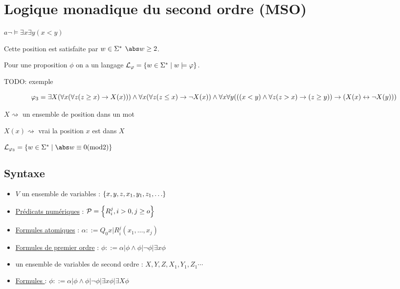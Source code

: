 \section{Logique monadique du second ordre (MSO)}

$ a \neg {\models} \exists x \exists y (x < y)$

Cette position est satisfaite par $w \in \Sigma^{*}$ \ssi $\abs w \geq 2$.

Pour une proposition $\phi$ on a un langage $\mathcal{L}_\varphi = \left\{w \in \Sigma^{*} \mid w \models \varphi\right\}$.


TODO: exemple


$$\varphi_3 = \exists X (\forall x (\forall z (z \geq x) \rightarrow X(x))) \land \forall x (\forall z (z \leq x) \rightarrow \lnot X(x)) \land
	\forall x \forall y (((x < y) \land \forall z(z > x) \rightarrow (z \geq y)) \rightarrow (X (x) \leftrightarrow \lnot X(y)))$$


$X \rightsquigarrow $ un ensemble de position dans un mot


$X (x)\rightsquigarrow$ vrai \ssi la position $x$ est dans $X$


$\La_{\phi_3} = \setdef {w \in \mots} {\abs w \equiv 0 (\text {mod} 2)}$

\subsection{Syntaxe}

\begin{definition} 
	\begin{itemize}
		\item $V$ un ensemble de variables : $\left\{x,y,z,x_1,y_1,z_1, \ldots\right\}$
		\item \underline{Prédicats numériques} :  $\mathcal{P} = \left\{R_i^j, i > 0, j \geq o\right\}$
		\item \underline{Formules atomiques} : $\alpha ::= Q_0 x | R_i^j(x_1, \ldots, x_j)$
		\item \underline{Formules de premier ordre} : $\phi ::= \alpha | \phi \land \phi | \lnot \phi | \exists x \phi$
	\end{itemize}
\end{definition}


\begin{definition} 
	\begin{itemize}
		\item un ensemble de variables de second ordre : $X,Y,Z,X_1,Y_1,Z_1 \cdots$
		\item \underline{Formules } : $\phi ::= \alpha | \phi \land \phi | \lnot \phi | \exists x \phi | \exists X \phi$
	\end{itemize}
\end{definition}


